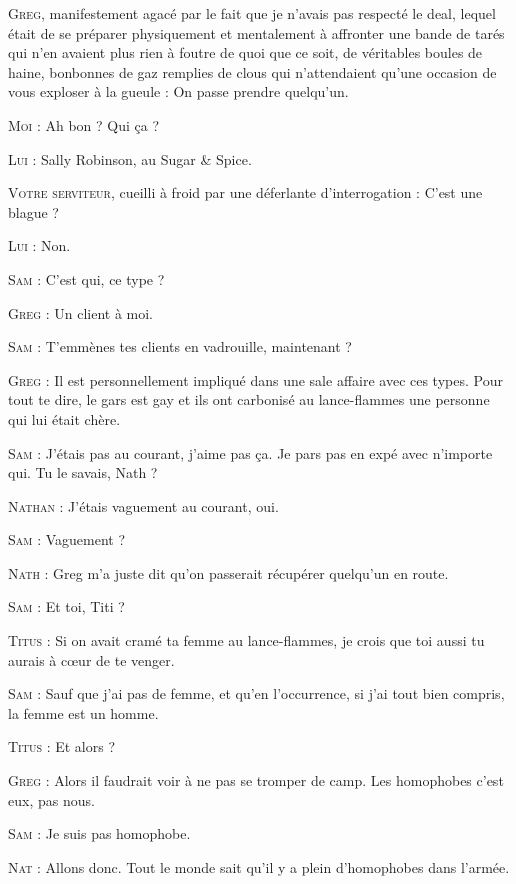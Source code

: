 \begin{dialogue}

\textsc{Greg}, manifestement agacé par le fait que je n’avais pas respecté le deal, lequel était de se préparer physiquement et mentalement à affronter une bande de tarés qui n’en avaient plus rien à foutre de quoi que ce soit, de véritables boules de haine, bonbonnes de gaz remplies de clous qui n’attendaient qu’une occasion de vous exploser à la gueule : On passe prendre quelqu’un.

\textsc{Moi} : Ah bon ? Qui ça ?

\textsc{Lui} : Sally Robinson, au Sugar \& Spice.

\textsc{Votre serviteur}, cueilli à froid par une déferlante d’interrogation : C’est une blague ?

\textsc{Lui} : Non.

\textsc{Sam} : C’est qui, ce type ?

\textsc{Greg} : Un client à moi.

\textsc{Sam} : T’emmènes tes clients en vadrouille, maintenant ?

\textsc{Greg} : Il est personnellement impliqué dans une sale affaire avec ces types. Pour tout te dire, le gars est gay et ils ont carbonisé au lance-flammes une personne qui lui était chère.

\textsc{Sam} : J’étais pas au courant, j’aime pas ça. Je pars pas en expé avec n’importe qui. Tu le savais, Nath ?

\textsc{Nathan} : J’étais vaguement au courant, oui.

\textsc{Sam} : Vaguement ?

\textsc{Nath} : Greg m’a juste dit qu’on passerait récupérer quelqu’un en route.

\textsc{Sam} : Et toi, Titi ?

\textsc{Titus} : Si on avait cramé ta femme au lance-flammes, je crois que toi aussi tu aurais à cœur de te venger.

\textsc{Sam} : Sauf que j’ai pas de femme, et qu’en l’occurrence, si j’ai tout bien compris, la femme est un homme.

\textsc{Titus} : Et alors ?

\textsc{Greg} : Alors il faudrait voir à ne pas se tromper de camp. Les homophobes c’est eux, pas nous.

\textsc{Sam} : Je suis pas homophobe.

\textsc{Nat} : Allons donc. Tout le monde sait qu’il y a plein d’homophobes dans l’armée.


\end{dialogue}
